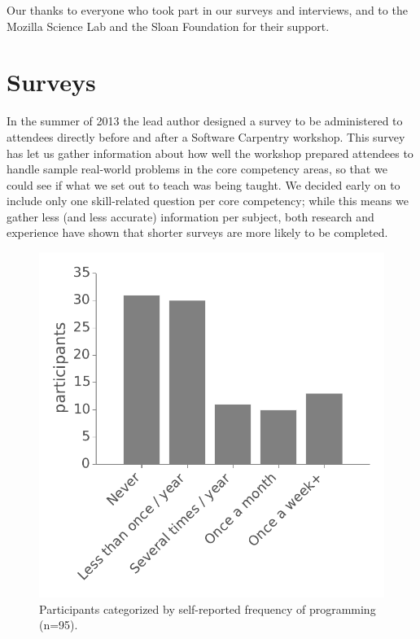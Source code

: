 \documentclass[10pt, twocolumn]{article}
\begin{document}
Our thanks to everyone who took part in our surveys and interviews,
and to the Mozilla Science Lab and the Sloan Foundation for their support.

\section{Surveys}

In the summer of 2013
the lead author designed a survey
to be administered to attendees directly before and after a Software Carpentry workshop.
This survey has let us gather information about
how well the workshop prepared attendees to handle sample real-world problems in the core competency areas,
so that we could see if what we set out to teach was being taught.
We decided early on to include only one skill-related question per core competency;
while this means we gather less (and less accurate) information per subject,
both research and experience have shown that shorter surveys are more likely to be completed.

\begin{figure}[!b]
\includegraphics[width=\linewidth]{ProgrammingFrequency}
\caption{Participants categorized by self-reported frequency of programming (n=95).\label{frequency}}

\end{figure}
\end{document}
